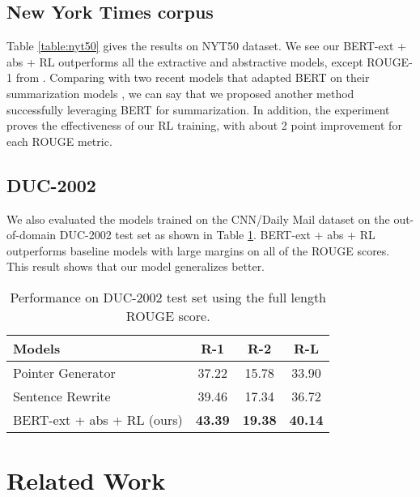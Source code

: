 \documentclass[11pt,a4paper]{article}
\begin{document}
\subsection{New York Times corpus}
Table \ref{table:nyt50} gives the results on NYT50 dataset.
We see our BERT-ext + abs + RL outperforms all the extractive
and abstractive models, except ROUGE-1 from \citet{liu2019fine}.
Comparing with two recent models that adapted BERT on their
summarization models \cite{liu2019fine, zhang2019pretraining},
we can say that we proposed another method successfully leveraging
BERT for summarization. In addition, the experiment proves
the effectiveness of our RL training, with about 2 point
improvement for each ROUGE metric.

\subsection{DUC-2002}
We also evaluated the models trained on the CNN/Daily Mail dataset
on the out-of-domain DUC-2002 test set as shown in Table \ref{table:duc2002}.
BERT-ext + abs + RL outperforms baseline models with large margins on
all of the ROUGE scores. This result shows that our model generalizes better.

\begin{table}
\begin{center}
\begin{adjustbox}{max width=\columnwidth}
\begin{tabular}{l|ccc}
    \hline 
    \bf Models & \bf R-1 & \bf R-2 & \bf R-L \\ 
    \hline
    Pointer Generator \cite{see-etal-2017-get} & 37.22 & 15.78 & 33.90 \\
    Sentence Rewrite \cite{chen-bansal-2018-fast} & 39.46 & 17.34 & 36.72 \\
    BERT-ext + abs + RL (ours) & \bf 43.39 & \bf 19.38 & \bf 40.14 \\
    \hline
\end{tabular}
\end{adjustbox}
\end{center}
\caption{\label{table:duc2002} Performance on DUC-2002 test set using
the full length ROUGE  score.}
\end{table}

\section{Related Work}
\end{document}
